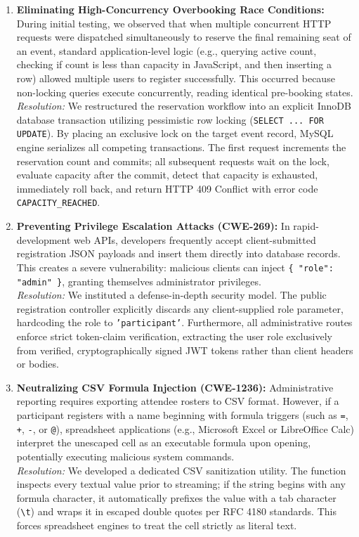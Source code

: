 \documentclass[11pt,a4paper]{report}
\begin{document}
\begin{enumerate}[leftmargin=1.5em, itemsep=0.8em]
    \item \textbf{Eliminating High-Concurrency Overbooking Race Conditions:}
    During initial testing, we observed that when multiple concurrent HTTP requests were dispatched simultaneously to reserve the final remaining seat of an event, standard application-level logic (e.g., querying active count, checking if count is less than capacity in JavaScript, and then inserting a row) allowed multiple users to register successfully. This occurred because non-locking queries execute concurrently, reading identical pre-booking states.
    \\\textit{Resolution:} We restructured the reservation workflow into an explicit InnoDB database transaction utilizing pessimistic row locking (\texttt{SELECT ... FOR UPDATE}). By placing an exclusive lock on the target event record, MySQL engine serializes all competing transactions. The first request increments the reservation count and commits; all subsequent requests wait on the lock, evaluate capacity after the commit, detect that capacity is exhausted, immediately roll back, and return HTTP 409 Conflict with error code \texttt{CAPACITY\_REACHED}.

    \item \textbf{Preventing Privilege Escalation Attacks (CWE-269):}
    In rapid-development web APIs, developers frequently accept client-submitted registration JSON payloads and insert them directly into database records. This creates a severe vulnerability: malicious clients can inject \texttt{\{ "role": "admin" \}}, granting themselves administrator privileges.
    \\\textit{Resolution:} We instituted a defense-in-depth security model. The public registration controller explicitly discards any client-supplied role parameter, hardcoding the role to \texttt{'participant'}. Furthermore, all administrative routes enforce strict token-claim verification, extracting the user role exclusively from verified, cryptographically signed JWT tokens rather than client headers or bodies.

    \item \textbf{Neutralizing CSV Formula Injection (CWE-1236):}
    Administrative reporting requires exporting attendee rosters to CSV format. However, if a participant registers with a name beginning with formula triggers (such as \texttt{=}, \texttt{+}, \texttt{-}, or \texttt{@}), spreadsheet applications (e.g., Microsoft Excel or LibreOffice Calc) interpret the unescaped cell as an executable formula upon opening, potentially executing malicious system commands.
    \\\textit{Resolution:} We developed a dedicated CSV sanitization utility. The function inspects every textual value prior to streaming; if the string begins with any formula character, it automatically prefixes the value with a tab character (\texttt{\textbackslash t}) and wraps it in escaped double quotes per RFC 4180 standards. This forces spreadsheet engines to treat the cell strictly as literal text.


\end{enumerate}
\end{document}
